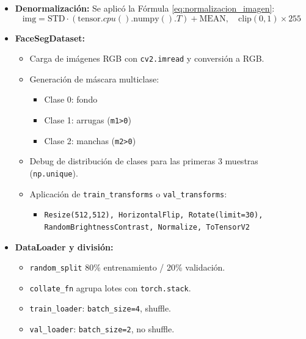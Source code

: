 \begin{enumerate}
\begin{itemize}
\begin{itemize}
    \item \textbf{Denormalización:}
    Se aplicó la Fórmula \ref{eq:normalizacion_imagen}:
    \begin{equation}\label{eq:normalizacion_imagen}
      \text{img} = \text{STD} \cdot (\text{tensor}.cpu().\text{numpy}().T) + \text{MEAN},\quad \text{clip}(0,1) \times 255
  \end{equation}
  
    \item \textbf{FaceSegDataset:}
      \begin{itemize}
        \item Carga de imágenes RGB con \texttt{cv2.imread} y conversión a RGB.
        \item Generación de máscara multiclase:
          \begin{itemize}
            \item Clase 0: fondo
            \item Clase 1: arrugas (\texttt{m1>0})
            \item Clase 2: manchas (\texttt{m2>0})
          \end{itemize}
        \item Debug de distribución de clases para las primeras 3 muestras (\texttt{np.unique}).
        \item Aplicación de \texttt{train\_transforms} o \texttt{val\_transforms}:
          \begin{itemize}
            \item \texttt{Resize(512,512), HorizontalFlip, Rotate(limit=30), RandomBrightnessContrast, Normalize, ToTensorV2}
          \end{itemize}
      \end{itemize}
  
    \item \textbf{DataLoader y división:}
      \begin{itemize}
        \item \texttt{random\_split} 80\% entrenamiento / 20\% validación.
        \item \texttt{collate\_fn} agrupa lotes con \texttt{torch.stack}.
        \item \texttt{train\_loader}: \texttt{batch\_size=4}, shuffle.
        \item \texttt{val\_loader}: \texttt{batch\_size=2}, no shuffle.
      \end{itemize}
  \end{itemize}
  

\end{itemize}
\end{enumerate}
